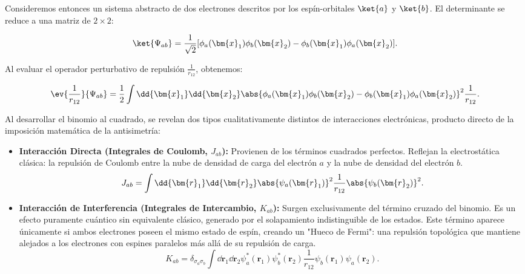 Consideremos entonces un sistema abstracto de dos electrones descritos por los espín-orbitales \( \ket{a} \) y \( \ket{b} \). El determinante se reduce a una matriz de $2 \times 2$:

\begin{equation}
  \ket{\Psi_{ab}} = \frac{1}{\sqrt{2}} [\phi_a(\bm{x}_1)\phi_b(\bm{x}_2) - \phi_b(\bm{x}_1)\phi_a(\bm{x}_2)].
\end{equation}

Al evaluar el operador perturbativo de repulsión \( \frac{1}{r_{12}} \), obtenemos:

\begin{equation}
  \ev{\frac{1}{r_{12}}}{\Psi_{ab}} = \frac{1}{2} \int \dd{\bm{x}_1} \dd{\bm{x}_2} \abs{\phi_a(\bm{x}_1)\phi_b(\bm{x}_2) - \phi_b(\bm{x}_1) \phi_a(\bm{x}_2) }^2 \frac{1}{r_{12}}.
\end{equation}

Al desarrollar el binomio al cuadrado, se revelan dos tipos cualitativamente distintos de interacciones electrónicas, producto directo de la imposición matemática de la antisimetría:

\begin{itemize}
\item \textbf{Interacción Directa (Integrales de Coulomb, \(J_{ab}\)):}
  Provienen de los términos cuadrados perfectos. Reflejan la electrostática clásica: la repulsión de Coulomb entre la nube de densidad de carga del electrón $a$ y la nube de densidad del electrón $b$. 
  \begin{equation}
  J_{ab} = \int \dd{\bm{r}_1} \dd{\bm{r}_2} \abs{\psi_a(\bm{r}_1)}^2 \frac{1}{r_{12}} \abs{\psi_b(\bm{r}_2)}^2.
  \end{equation}

\item \textbf{Interacción de Interferencia (Integrales de Intercambio, \(K_{ab}\)):}
  Surgen exclusivamente del término cruzado del binomio. Es un efecto puramente cuántico sin equivalente clásico, generado por el solapamiento indistinguible de los estados. Este término aparece únicamente si ambos electrones poseen el mismo estado de espín, creando un "Hueco de Fermi": una repulsión topológica que mantiene alejados a los electrones con espines paralelos más allá de su repulsión de carga.
  \begin{equation}
  K_{ab} = \delta_{\sigma_a \sigma_b} \int \dd{\bm{r}_1} \dd{\bm{r}_2} \psi_a^*(\bm{r}_1)\psi_b^*(\bm{r}_2)\frac{1}{r_{12}}\psi_b(\bm{r}_1)\psi_a(\bm{r}_2).
  \end{equation}
\end{itemize}

